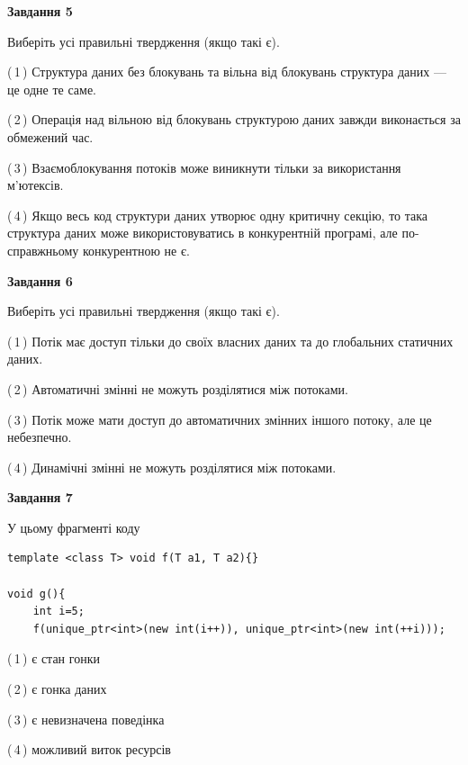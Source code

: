 \documentclass[12pt, ukrainian]{article}
\begin{document}
\begin {large}
{\begin{center}
\textbf{Завдання 5}
\end{center}

Виберіть усі правильні твердження (якщо такі є).\par
\vspace{2mm}

(\,1\,) Структура даних без блокувань та вільна від блокувань структура даних --- це одне те саме.%

(\,2\,) Операція над вільною від блокувань структурою даних завжди виконається за обмежений час.%

(\,3\,) Взаємоблокування потоків може виникнути тільки за використання м’ютексів.%

(\,4\,) Якщо весь код структури даних утворює одну критичну секцію, то така структура даних може використовуватись в конкурентній програмі, але по-справжньо\-му конкурентною не є.%
\newpage


\begin{center}
\textbf{Завдання 6}
\end{center}

Виберіть усі правильні твердження (якщо такі є).\par
\vspace{2mm}

(\,1\,) Потік має доступ тільки до своїх власних даних та до глобальних статичних даних.%

(\,2\,) Автоматичні змінні не можуть розділятися між потоками.%

(\,3\,) Потік може мати доступ до автоматичних змінних іншого потоку, але це небезпечно.%

(\,4\,) Динамічні змінні не можуть розділятися між потоками.%


\begin{center}
\textbf{Завдання 7}
\end{center}

У цьому фрагменті коду
\begin{verbatim}
template <class T> void f(T a1, T a2){}

void g(){
    int i=5;
    f(unique_ptr<int>(new int(i++)), unique_ptr<int>(new int(++i)));
\end{verbatim}

(\,1\,) є стан гонки%

(\,2\,) є гонка даних%

(\,3\,) є невизначена поведінка%

(\,4\,) можливий виток ресурсів%

}
\end {large}

\vspace{4mm}
\newpage
\end{document}
